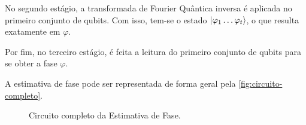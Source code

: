 No segundo estágio, a transformada de Fourier Quântica inversa é
aplicada no primeiro conjunto de qubits.
Com isso, tem-se o estado \(\ket{\varphi_1 \dots \varphi_t}\), o que resulta exatamente em
\(\varphi\).

Por fim, no terceiro estágio, é feita a leitura do primeiro conjunto de
qubits para se obter a fase \(\varphi\).

A estimativa de fase pode ser representada de forma geral pela \autoref{fig:circuito-completo}.

\begin{figure}[!htb]
    \centering
    
    \caption{Circuito completo da Estimativa de Fase.}
    \label{fig:circuito-completo}
\end{figure}
